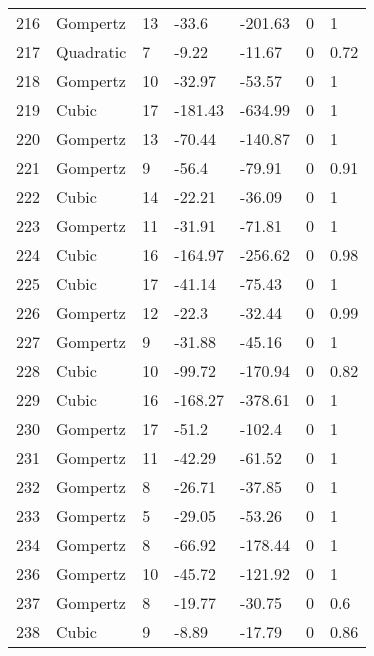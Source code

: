 \documentclass[11pt]{article}
\begin{document}
\begin{center}
\begin{longtable}{lllllll}
        216 & Gompertz  & 13              & -33.6   & -201.63 & 0       & 1    \\
        217 & Quadratic & 7               & -9.22   & -11.67  & 0       & 0.72 \\
        218 & Gompertz  & 10              & -32.97  & -53.57  & 0       & 1    \\
        219 & Cubic     & 17              & -181.43 & -634.99 & 0       & 1    \\
        220 & Gompertz  & 13              & -70.44  & -140.87 & 0       & 1    \\
        221 & Gompertz  & 9               & -56.4   & -79.91  & 0       & 0.91 \\
        222 & Cubic     & 14              & -22.21  & -36.09  & 0       & 1    \\
        223 & Gompertz  & 11              & -31.91  & -71.81  & 0       & 1    \\
        224 & Cubic     & 16              & -164.97 & -256.62 & 0       & 0.98 \\
        225 & Cubic     & 17              & -41.14  & -75.43  & 0       & 1    \\
        226 & Gompertz  & 12              & -22.3   & -32.44  & 0       & 0.99 \\
        227 & Gompertz  & 9               & -31.88  & -45.16  & 0       & 1    \\
        228 & Cubic     & 10              & -99.72  & -170.94 & 0       & 0.82 \\
        229 & Cubic     & 16              & -168.27 & -378.61 & 0       & 1    \\
        230 & Gompertz  & 17              & -51.2   & -102.4  & 0       & 1    \\
        231 & Gompertz  & 11              & -42.29  & -61.52  & 0       & 1    \\
        232 & Gompertz  & 8               & -26.71  & -37.85  & 0       & 1    \\
        233 & Gompertz  & 5               & -29.05  & -53.26  & 0       & 1    \\
        234 & Gompertz  & 8               & -66.92  & -178.44 & 0       & 1    \\
        236 & Gompertz  & 10              & -45.72  & -121.92 & 0       & 1    \\
        237 & Gompertz  & 8               & -19.77  & -30.75  & 0       & 0.6  \\
        238 & Cubic     & 9               & -8.89   & -17.79  & 0       & 0.86 \\

\end{longtable}
\end{center}
\end{document}
